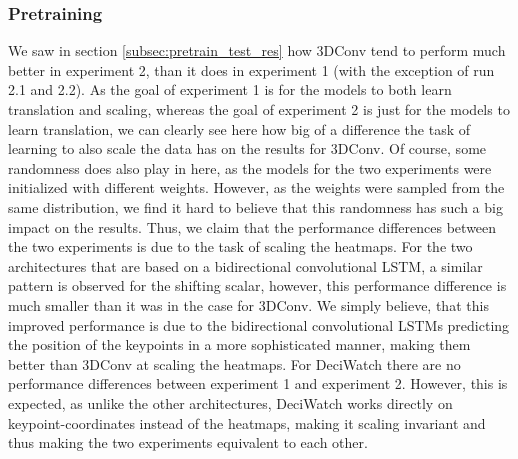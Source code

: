 \documentclass[./main.tex]{subfiles}
\begin{document}
\subsubsection{Pretraining}
We saw in section \ref{subsec:pretrain_test_res} how 3DConv tend to perform much better in experiment 2, than it does in experiment 1 (with the exception of run 2.1 and 2.2). As the goal of experiment 1 is for the models to both learn translation and scaling, whereas the goal of experiment 2 is just for the models to learn translation, we can clearly see here how big of a difference the task of learning to also scale the data has on the results for 3DConv. Of course, some randomness does also play in here, as the models for the two experiments were initialized with different weights. However, as the weights were sampled from the same distribution, we find it hard to believe that this randomness has such a big impact on the results. Thus, we claim that the performance differences between the two experiments is due to the task of scaling the heatmaps. For the two architectures that are based on a bidirectional convolutional LSTM, a similar pattern is observed for the shifting scalar, however, this performance difference is much smaller than it was in the case for 3DConv. We simply believe, that this improved performance is due to the bidirectional convolutional LSTMs predicting the position of the keypoints in a more sophisticated manner, making them better than 3DConv at scaling the heatmaps. For DeciWatch there are no performance differences between experiment 1 and experiment 2. However, this is expected, as unlike the other architectures, DeciWatch works directly on keypoint-coordinates instead of the heatmaps, making it scaling invariant and thus making the two experiments equivalent to each other. 
\\
\\
\end{document}
